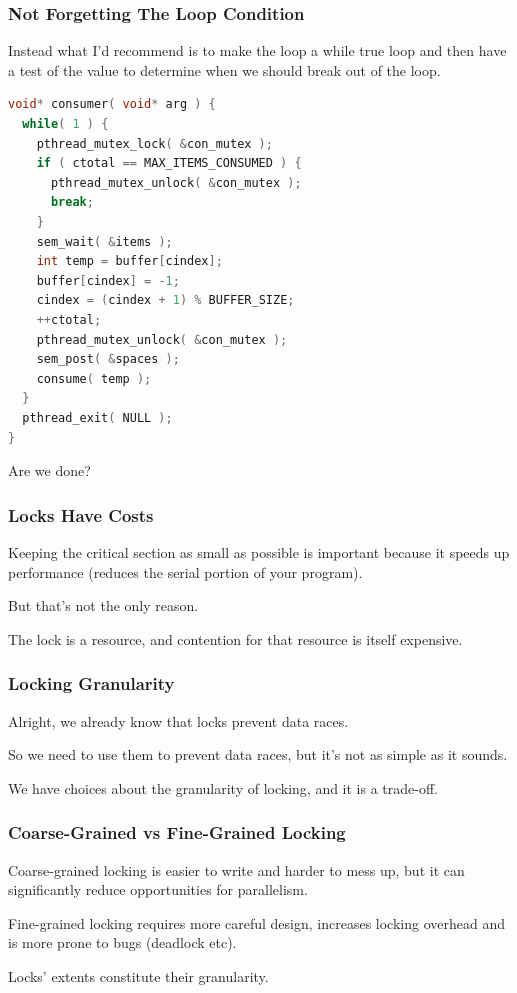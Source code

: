 \begin{frame}[fragile]
\frametitle{Not Forgetting The Loop Condition}

 Instead what I'd recommend is to make the loop a while true loop and then have a test of the value to determine when we should break out of the loop.
 
 \begin{lstlisting}[language=C]
void* consumer( void* arg ) { 
  while( 1 ) { 
    pthread_mutex_lock( &con_mutex );  
    if ( ctotal == MAX_ITEMS_CONSUMED ) {
      pthread_mutex_unlock( &con_mutex );
      break;
    }   
    sem_wait( &items );
    int temp = buffer[cindex];
    buffer[cindex] = -1; 
    cindex = (cindex + 1) % BUFFER_SIZE;
    ++ctotal;
    pthread_mutex_unlock( &con_mutex );
    sem_post( &spaces );
    consume( temp );
  }
  pthread_exit( NULL );
}
\end{lstlisting}

Are we done?

\end{frame}


\begin{frame}
\frametitle{Locks Have Costs}

Keeping the critical section as small as possible is important because it speeds up performance (reduces the serial portion of your program). 

But that's not the only reason. 

The lock is a resource, and contention for that resource is itself expensive.


\end{frame}


\begin{frame}
\frametitle{Locking Granularity}
Alright, we already know that locks prevent data races.

So we need to use them to prevent data races, but it's not as simple as it sounds. 

We have choices about the granularity of locking, and it is a trade-off.


\end{frame}

\begin{frame}
\frametitle{Coarse-Grained vs Fine-Grained Locking}

\alert{Coarse-grained} locking is easier to write and harder to mess up, but it can significantly reduce opportunities for parallelism. 

\alert{Fine-grained locking} requires more careful design,
increases locking overhead and is more prone to bugs (deadlock etc).  


Locks' extents constitute their granularity. 

\end{frame}

